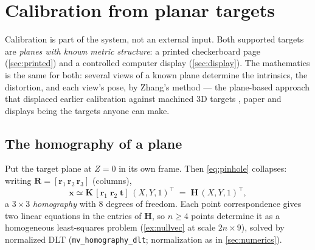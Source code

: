 \documentclass[11pt]{article}
\theoremstyle{definition}
\newcommand{\mat}[1]{\mathbf{#1}}
\newcommand{\vect}[1]{\mathbf{#1}}
\newcommand{\R}{\mat{R}}
\newcommand{\K}{\mat{K}}
\newcommand{\Hm}{\mat{H}}
\newcommand{\x}{\vect{x}}
\newcommand{\tv}{\vect{t}}
\newcommand{\code}[1]{\texttt{#1}}
\begin{document}
\section{Calibration from planar targets}
\label{sec:calib}

Calibration is part of the system, not an external input. Both supported
targets are \emph{planes with known metric structure}: a printed
checkerboard page (\autoref{sec:printed}) and a controlled computer display
(\autoref{sec:display}). The mathematics is the same for both: several views
of a known plane determine the intrinsics, the distortion, and each view's
pose, by Zhang's method \cite{Zhang2000,SturmMaybank1999} --- the
plane-based approach that displaced earlier calibration against machined
3D targets \cite{Tsai1987}, paper and displays being the targets anyone
can make.

\subsection{The homography of a plane}
\label{sec:homography}

Put the target plane at $Z=0$ in its own frame. Then \eqref{eq:pinhole}
collapses: writing $\R=[\vect r_1\,\vect r_2\,\vect r_3]$ (columns),
\begin{equation}
\x \simeq \K\,[\vect r_1\;\vect r_2\;\tv]\,(X,Y,1)^{\!\top}
\;=\; \Hm\,(X,Y,1)^{\!\top},
\label{eq:planehom}
\end{equation}
a $3\times3$ \emph{homography} with 8 degrees of freedom. Each point
correspondence gives two linear equations in the entries of $\Hm$, so
$n\ge4$ points determine it as a homogeneous least-squares problem
(\autoref{ex:nullvec} at scale $2n\times9$), solved by normalized DLT
(\code{mv\_homography\_dlt}; normalization as in \autoref{sec:numerics}).
\end{document}
